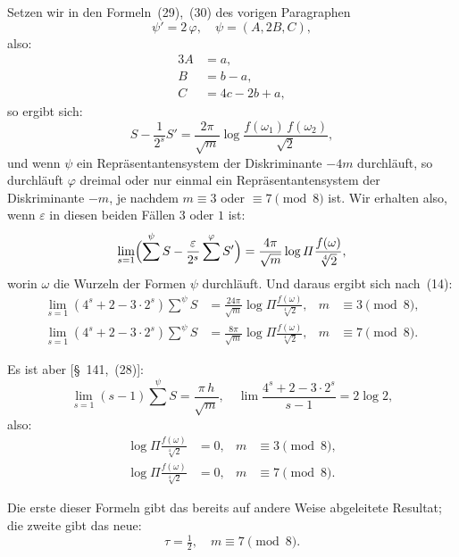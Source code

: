 \documentclass[12pt,a4paper]{article}
\theoremstyle{definition}
\begin{document}
Setzen wir in den Formeln~(29),~(30) des vorigen Paragraphen
\[
\psi' = 2\,\varphi,\quad \psi = (A, 2B, C),
\]
also:
\begin{alignat*}{3}
A &= a,\\
B &= b - a,\\
C &= 4c - 2b + a,
\end{alignat*}
so ergibt sich:
\[
S - \frac{1}{2^{s}}S' = \frac{2\pi}{\sqrt{m}}
\log\frac{f(\omega_{1})\,f(\omega_{2})}{\sqrt{2}},
\]
und wenn $\psi$ ein Repräsentantensystem der Diskriminante $-4m$ 
durchläuft, so durchläuft $\varphi$ dreimal oder nur einmal ein 
Repräsentantensystem der Diskriminante $-m$, je nachdem $m \equiv 3$ oder 
$\equiv 7 \pmod 8$ ist. Wir erhalten also, wenn $\varepsilon$ in diesen 
beiden Fällen $3$ oder $1$ ist:
\begin{equation}
\lim_{s=1}\Bigl(\sum^{\psi} S - \frac{\varepsilon}{2^{s}}\sum^{\varphi} S'\Bigr)
= \frac{4\pi}{\sqrt{m}}\log\varPi\frac{f(\omega)}{\sqrt[4]{2}},
\end{equation}
worin $\omega$ die Wurzeln der Formen $\psi$ durchläuft. Und daraus ergibt 
sich nach~(14):
\begin{equation}
\begin{aligned}
\lim_{s=1} (4^{s} + 2 - 3\cdot 2^{s})\sum^{\psi} S
&= \frac{24\pi}{\sqrt{m}}\log\varPi\frac{f(\omega)}{\sqrt[4]{2}},
&m &\equiv 3 \pmod 8,\\
\lim_{s=1} (4^{s} + 2 - 3\cdot 2^{s})\sum^{\psi} S
&= \frac{8\pi}{\sqrt{m}}\log\varPi\frac{f(\omega)}{\sqrt[4]{2}},
&m &\equiv 7 \pmod 8.
\end{aligned}
\end{equation}

Es ist aber [\S~141,~(28)]:
\[
\lim_{s=1} (s-1)\sum^{\psi} S = \frac{\pi\,h}{\sqrt{m}},\quad
\lim \frac{4^{s} + 2 - 3\cdot 2^{s}}{s-1} = 2\log 2,
\]
also:
\begin{equation}
\begin{aligned}
\log\varPi\frac{f(\omega)}{\sqrt[4]{2}} &= 0, & m &\equiv 3 \pmod 8,\\
\log\varPi\frac{f(\omega)}{\sqrt[4]{2}} &= 0, & m &\equiv 7 \pmod 8.
\end{aligned}
\end{equation}

Die erste dieser Formeln gibt das bereits auf andere Weise abgeleitete 
Resultat; die zweite gibt das neue:
\begin{equation}
\tau = \tfrac{1}{2},\quad m \equiv 7 \pmod 8.
\end{equation}
\end{document}
